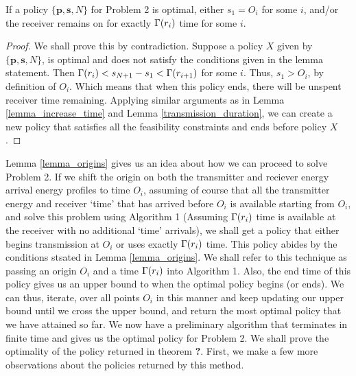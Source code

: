 \begin{lemma}
If a policy $\{\bm{p},\bm{s},N\}$ for Problem 2 is optimal, either $s_1 = O_i$ for some $i$, and/or the receiver remains on for exactly $\Gamma(r_i)$ time for some $i$.
\label{lemma_origins}
\end{lemma}
\begin{proof}
We shall prove this by contradiction. Suppose a policy $X$ given by $\{\bm{p},\bm{s},N\}$, is optimal and does not satisfy the conditions given in the lemma statement. Then $\Gamma(r_{i})<s_{N+1}-s_1<\Gamma(r_{i+1})$ for some $i$. Thus, $s_1>O_i$, by definition of $O_i$. Which means that when this policy ends, there will be unspent receiver time remaining. Applying similar arguments as in Lemma \ref{lemma_increase_time} and Lemma \ref{transmission_duration}, we can create a new policy that satisfies all the feasibility constraints and ends before policy $X$.
\end{proof}

Lemma \ref{lemma_origins} gives us an idea about how we can proceed to solve Problem 2. If we shift the origin on both the transmitter and reciever energy arrival energy profiles to time $O_i$, assuming of course that all the transmitter energy and receiver `time' that has arrived before $O_i$ is available starting from $O_i$, and solve this problem using Algorithm 1 (Assuming $\Gamma(r_i)$ time is available at the receiver with no additional `time' arrivals), we shall get a policy that either begins transmission at $O_i$ or uses exactly $\Gamma(r_i)$ time. This policy abides by the conditions stsated in Lemma \ref{lemma_origins}. We shall refer to this technique as passing an origin $O_i$ and a time $\Gamma(r_i)$ into Algorithm 1. Also, the end time of this policy gives us an upper bound to when the optimal policy begins (or ends). We can thus, iterate, over all points $O_i$ in this manner and keep updating our upper bound until we cross the upper bound, and return the most optimal policy that we have attained so far. We now have a preliminary algorithm that terminates in finite time and gives us the optimal policy for Problem 2. We shall prove the optimality of the policy returned in theorem \textbf{?}. First, we make a few more observations about the policies returned by this method. 


